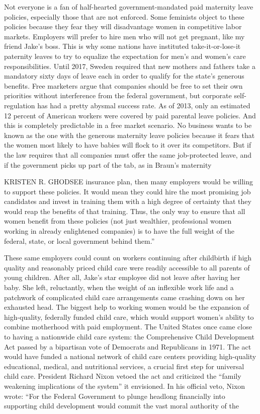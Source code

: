 Not everyone is a fan of half-hearted government-mandated paid maternity leave policies, especially those that are not enforced. Some feminists object to these policies because they fear they will disadvantage women in competitive labor markets. Employers will prefer to hire men who will not get pregnant, like my friend Jake’s boss. This is why some nations have instituted take-it-or-lose-it paternity leaves to try to equalize the expectation for men’s and women’s care responsibilities. Until 2017, Sweden required that new mothers and fathers take a mandatory sixty days of leave each in order to qualify for the state’s generous benefits. Free marketers argue that companies should be free to set their own priorities without interference from the federal government, but corporate self-regulation has had a pretty abysmal success rate. As of 2013, only an estimated {\color{blue}12} percent of American workers were covered by paid parental leave policies. And this is completely predictable in a free market scenario. No business wants to be known as the one with the generous maternity leave policies because it fears that the women most likely to have babies will flock to it over its competitors. But if the law requires that all companies must offer the same job-protected leave, and if the government picks up part of the tab, as in Braun’s maternity
 \par 
KRISTEN R. GHODSEE insurance plan, then many employers would be willing to support these policies. It would mean they could hire the most promising job candidates and invest in training them with a high degree of certainty that they would reap the benefits of that training. Thus, the only way to ensure that all women benefit from these policies (not just wealthier, professional women working in already enlightened companies) is to have the full weight of the federal, state, or local government behind them.”
 \par 
These same employers could count on workers continuing after childbirth if high quality and reasonably priced child care were readily accessible to all parents of young children. After all, Jake’s star employee did not leave after having her baby. She left, reluctantly, when the weight of an inflexible work life and a patchwork of complicated child care arrangements came crashing down on her exhausted head. The biggest help to working women would be the expansion of high-quality, federally funded child care, which would support women’s ability to combine motherhood with paid employment. The United States once came close to having a nationwide child care system: the Comprehensive Child Development Act passed by a bipartisan vote of Democrats and Republicans in 1971. The act would have funded a national network of child care centers providing high-quality educational, medical, and nutritional services, a crucial first step for universal child care. President Richard Nixon vetoed the act and criticized the “family weakening implications of the system” it envisioned. In his official veto, Nixon wrote: “For the Federal Government to plunge headlong financially into supporting child development would commit the vast moral authority of the
